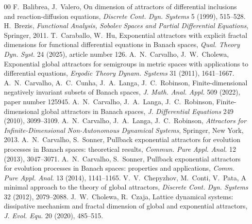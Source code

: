 \documentclass[a4paper,12pt,reqno]{amsart}
\theoremstyle{plain}
\theoremstyle{definition}
\numberwithin{equation}{section}
\begin{document}
\begin{thebibliography}{00}
%
F.~Balibrea, J.~Valero,
On dimension of attractors of differential inclusions and reaction-diffusion equations,
\textit{Discrete Cont. Dyn. Systems} 5 (1999), 515--528.
%
H.~Brezis,
\textit{Functional Analysis, Sobolev Spaces and Partial Differential Equations},
Springer, 2011. 
%
T.~Caraballo, W.~Hu,
Exponential attractors with explicit fractal dimensions for functional differential equations in Banach spaces,
\textit{Qual. Theory Dyn. Syst.} 24 (2025), article number 126.
%
A.~N.~Carvalho, J.~W.~Cholewa,
Exponential global attractors for semigroups in metric spaces with applications to differential equations,
\textit{Ergodic Theory Dynam. Systems} 31 (2011), 1641--1667.
%
A.~N.~Carvalho, A.~C.~Cunha, J.~A.~Langa, J.~C.~Robinson,
Finite-dimensional negatively invariant subsets of Banach spaces,
\textit{J. Math. Anal. Appl.} 509 (2022), paper number 125945.
%
A.~N.~Carvalho, J.~A.~Langa, J.~C.~Robinson,
Finite-dimensional global attractors in Banach spaces,
\textit{J. Differential Equations} 249 (2010), 3099--3109.
%
A.~N.~Carvalho, J.~A.~Langa, J.~C.~Robinson,
\textit{Attractors for Infinite-Dimensional Non-Autonomous Dynamical Systems},
Springer, New York, 2013.
%
A.~N.~Carvalho, S.~Sonner, 
Pullback exponential attractors for evolution processes in Banach spaces: theoretical results, 
\textit{Commun. Pure Appl. Anal.} 12 (2013), 3047--3071.
%
A.~N.~Carvalho, S.~Sonner, 
Pullback exponential attractors for evolution processes in Banach spaces: properties and applications, 
\textit{Comm. Pure Appl. Anal.} 13 (2014), 1141--1165.
%
V.~V.~Chepyzhov, M.~Conti, V.~Pata, 
A minimal approach to the theory of global attractors,
\textit{Discrete Cont. Dyn. Systems} 32 (2012), 2079--2088.
%
J.~W.~Cholewa, R.~Czaja,
Lattice dynamical systems: dissipative mechanism and fractal dimension of global and exponential attractors, 
\textit{J. Evol. Equ.} 20 (2020), 485--515.


\end{thebibliography}
\end{document}
